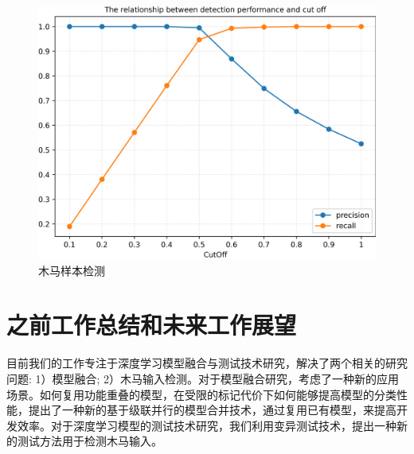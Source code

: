 \documentclass[fontset=macnew,UTF8]{article} %
\begin{document}
\begin{figure}[h!]
{\begin{minipage}[b]{.3\linewidth}
			\includegraphics[scale=0.28]{./Backdoor_detect_result/detect/WaNet.png}
		\end{minipage}
	}
	
	\caption{木马样本检测}
	\label{detect}
\end{figure}


\section{之前工作总结和未来工作展望}

目前我们的工作专注于深度学习模型融合与测试技术研究，解决了两个相关的研究问题: 1）模型融合; 2）木马输入检测。对于模型融合研究，考虑了一种新的应用场景。如何复用功能重叠的模型，在受限的标记代价下如何能够提高模型的分类性能，提出了一种新的基于级联并行的模型合并技术，通过复用已有模型，来提高开发效率。对于深度学习模型的测试技术研究，我们利用变异测试技术，提出一种新的测试方法用于检测木马输入。
\end{document}

